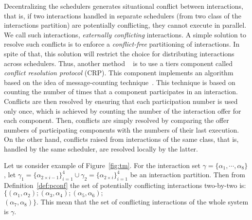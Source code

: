 Decentralizing the schedulers generates situational conflict between interactions, that is, 
if two interactions handled in separate schedulers (from two class of the interactions partition)
are potentially conflicting, they cannot execute in parallel. We call such interactions,
\emph{externally conflicting} interactions. 
A simple solution to resolve such conflicts is to enforce
a \emph{conflict-free} partitioning of interactions. In spite of that, this solution will 
restrict the choice for distributing interactions across schedulers. Thus, another method
~\cite{} is to use a tiers component called \emph{conflict resolution protocol} (CRP). This
component implements an algorithm based on the idea of message-counting technique~\cite{}.
This technique is based on counting the number of times that a component participates in an 
interaction. Conflicts are then resolved by ensuring that each participation number is used 
only once, which is achieved by counting the number of the interaction offer for each 
component. Then, conflicts are simply resolved by comparing the offer numbers of participating
components with the numbers of their last execution.
On the other hand, conflicts raised from interactions of the same class, that is, handled by 
the same scheduler, are resolved locally by the latter.
\begin{example}\label{exp:partition}
  Let us consider example of Figure~\ref{fig:tm}. For the interaction set $\gamma=\{\alpha_1,
  \cdots,\alpha_8\}$, let $\gamma_1=\{\alpha_{2\times i-1}\}_{i=1}^4\cup\gamma_2=
  \{\alpha_{2\times i}\}_{i=1}^4$ be an interaction partition. Then from 
  Definition~\ref{def:pconf} the set of potentially conflicting interactions two-by-two is:
  $\{(\alpha_1,\alpha_2);(\alpha_3,\alpha_4);(\alpha_5,\alpha_6);$\\$(\alpha_7,\alpha_8)\}$.
  This mean that the set of conflicting interactions of the whole system is $\gamma$.
\end{example}

